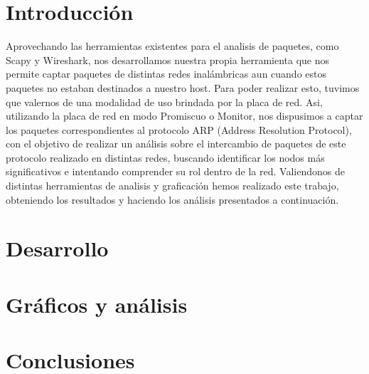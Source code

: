 \documentclass[a4paper, 11pt]{article}
\begin{document}
\pagestyle{myheadings}
\maketitle

\thispagestyle{empty}
\tableofcontents

\newpage

\section{Introducción}

Aprovechando las herramientas existentes para el analisis de paquetes, como Scapy y Wireshark, nos desarrollamos nuestra propia herramienta que nos permite captar paquetes de distintas redes inal\'ambricas aun cuando estos paquetes no estaban destinados a nuestro host. Para poder realizar esto, tuvimos que valernos de una modalidad de uso brindada por la placa de red.
Asi, utilizando la placa de red en modo Promiscuo o Monitor, nos dispusimos a captar los paquetes correspondientes al protocolo ARP (Address Resolution Protocol), con el objetivo de realizar un an\'alisis sobre el intercambio de paquetes de este protocolo realizado en distintas redes, buscando identificar los nodos m\'as significativos e intentando comprender su rol dentro de la red.
Valiendonos de distintas herramientas de analisis y graficaci\'on hemos realizado este trabajo, obteniendo los resultados y haciendo los an\'alisis presentados a continuaci\'on.

\section{Desarrollo}

\section{Gráficos y análisis}

\section{Conclusiones}
\end{document}
